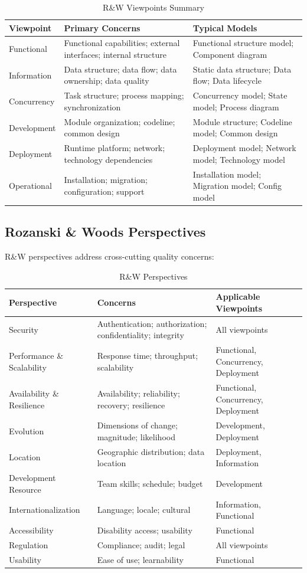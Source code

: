 \documentclass[11pt]{article}
\begin{document}
\begin{longtable}{@{}L{2.5cm} L{4cm} L{6cm}@{}}
\caption{R\&W Viewpoints Summary} \\
\toprule
\textbf{Viewpoint} & \textbf{Primary Concerns} & \textbf{Typical Models} \\
\midrule
\endfirsthead
\bottomrule
\endlastfoot
Functional & Functional capabilities; external interfaces; internal structure & Functional structure model; Component diagram \\
Information & Data structure; data flow; data ownership; data quality & Static data structure; Data flow; Data lifecycle \\
Concurrency & Task structure; process mapping; synchronization & Concurrency model; State model; Process diagram \\
Development & Module organization; codeline; common design & Module structure; Codeline model; Common design \\
Deployment & Runtime platform; network; technology dependencies & Deployment model; Network model; Technology model \\
Operational & Installation; migration; configuration; support & Installation model; Migration model; Config model \\
\end{longtable}

\subsection{Rozanski \& Woods Perspectives}

R\&W perspectives address cross-cutting quality concerns:

\begin{longtable}{@{}L{3cm} L{4.5cm} L{5cm}@{}}
\caption{R\&W Perspectives} \\
\toprule
\textbf{Perspective} & \textbf{Concerns} & \textbf{Applicable Viewpoints} \\
\midrule
\endfirsthead
\bottomrule
\endlastfoot
Security & Authentication; authorization; confidentiality; integrity & All viewpoints \\
Performance \& Scalability & Response time; throughput; scalability & Functional, Concurrency, Deployment \\
Availability \& Resilience & Availability; reliability; recovery; resilience & Functional, Concurrency, Deployment \\
Evolution & Dimensions of change; magnitude; likelihood & Development, Deployment \\
Location & Geographic distribution; data location & Deployment, Information \\
Development Resource & Team skills; schedule; budget & Development \\
Internationalization & Language; locale; cultural & Information, Functional \\
Accessibility & Disability access; usability & Functional \\
Regulation & Compliance; audit; legal & All viewpoints \\
Usability & Ease of use; learnability & Functional \\
\end{longtable}
\end{document}
